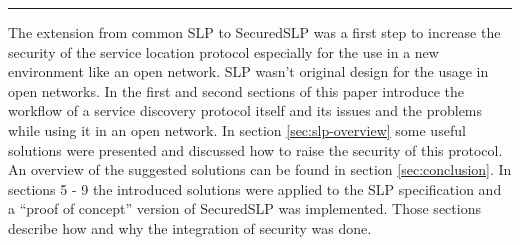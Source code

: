 \hrule
The extension from common SLP to SecuredSLP was a first step to increase the security of the service location protocol especially for the use in a new environment like an open network. SLP wasn't original design for the usage in open networks. In the first and second sections of this paper introduce the workflow of a service discovery protocol itself and its issues and the problems while using it in an open network. In section \ref{sec:slp-overview} some useful solutions were presented and discussed how to raise the security of this protocol. An overview of the suggested solutions can be found in section \ref{sec:conclusion}. In sections 5 - 9 the introduced solutions were applied to the SLP specification and a ``proof of concept'' version of SecuredSLP was implemented. Those sections describe how and why the integration of security was done.